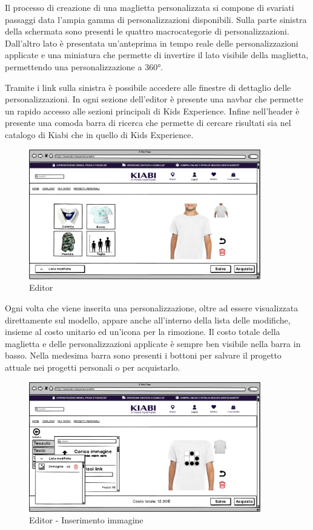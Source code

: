 \documentclass[12pt,italian,]{report}
\begin{document}
Il processo di creazione di una maglietta personalizzata si compone di
svariati passaggi data l'ampia gamma di personalizzazioni disponibili.
Sulla parte sinistra della schermata sono presenti le quattro
macrocategorie di personalizzazioni. Dall'altro lato è presentata
un'anteprima in tempo reale delle personalizzazioni applicate e una
miniatura che permette di invertire il lato visibile della maglietta,
permettendo una personalizzazione a 360°.

Tramite i link sulla sinistra è possibile accedere alle finestre di
dettaglio delle personalizzazioni. In ogni sezione dell'editor è
presente una navbar che permette un rapido accesso alle sezioni
principali di Kids Experience. Infine nell'header è presente una comoda barra di
ricerca che permette di cercare risultati sia nel catalogo di Kiabi che
in quello di Kids Experience.

\begin{figure}[h]
\centering
\includegraphics[width=0.9\textwidth]{../balsamiq/balsamiq_finale/Editorbase.png}
\caption{Editor}
\end{figure}

Ogni volta che viene inserita una personalizzazione, oltre ad essere visualizzata direttamente sul modello, appare anche all'interno della lista delle modifiche, insieme al costo unitario ed un'icona per la rimozione. Il costo totale della maglietta e delle personalizzazioni applicate è sempre ben visibile nella barra in basso.
Nella medesima barra sono presenti i bottoni per salvare il progetto attuale nei progetti personali o per acquistarlo.

\begin{figure}[h]
\centering
\includegraphics[width=0.9\textwidth]{../balsamiq/balsamiq_finale/Editor-caratteristicabustoimmagine4.png}
\caption{Editor - Inserimento immagine}
\end{figure}
\end{document}
